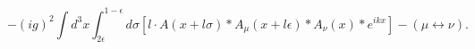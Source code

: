 \begin{equation}
  -(ig)^2 \int d^3 x \int_{2 \epsilon}^{1-\epsilon} d \sigma
  \left[
  l \cdot A(x+l \sigma) \ast A_\mu (x+l \epsilon) \ast A_\nu (x)
  \ast e^{ikx} \right] - ( \mu \leftrightarrow \nu ).
\end{equation}


